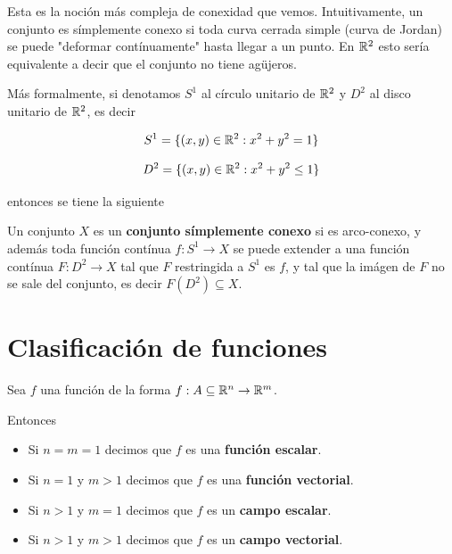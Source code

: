 Esta es la noción más compleja de conexidad que vemos.  Intuitivamente, un conjunto es símplemente conexo si toda curva cerrada simple (curva de Jordan) se puede "deformar contínuamente" hasta llegar a un punto.  En $ \mathbb{R}^2$ esto sería equivalente a decir que el conjunto no tiene agüjeros.  

Más formalmente, si denotamos $S^1$ al círculo unitario de $\mathbb{R}^2$ y $D^2$ al disco unitario de $\mathbb{R}^2$, es decir

$$ S^1 = \{(x,y) \in \mathbb{R}^2 : x^2 + y^2 = 1 \} $$

$$ D^2 = \{(x,y) \in \mathbb{R}^2 : x^2 + y^2 \leq 1 \} $$

entonces se tiene la siguiente

\begin{definition}
Un conjunto $X$ es un \textbf{conjunto símplemente conexo}  si es arco-conexo, y además toda función contínua $f : S^1 \to X$ se puede extender a una función contínua $F : D^2 \to X$ tal que $F$ restringida a $S^1$ es $f$, y tal que la imágen de $F$ no se sale del conjunto, es decir $F(D^2) \subseteq X$.
\end{definition}

\section{Clasificación de funciones}

\begin{definition}
Sea $f$ una función de la forma $ f : A \subseteq \mathbb{R}^n \to \mathbb{R}^m$.  

Entonces

\begin{itemize}
\item Si $n=m=1$ decimos que $f$ es una \textbf{función escalar}. 

\item Si $n=1$ y $m>1$ decimos que $f$ es una \textbf{función vectorial}. 

\item Si $n>1$ y $m=1$ decimos que $f$ es un \textbf{campo escalar}. 

\item Si $n>1$ y $m>1$ decimos que $f$ es un \textbf{campo vectorial}. 
\end{itemize}

\end{definition}

